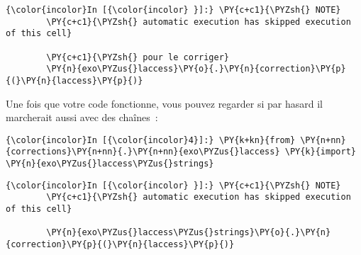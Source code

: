     \begin{Verbatim}[commandchars=\\\{\}]
{\color{incolor}In [{\color{incolor} }]:} \PY{c+c1}{\PYZsh{} NOTE}
        \PY{c+c1}{\PYZsh{} automatic execution has skipped execution of this cell}
        
        \PY{c+c1}{\PYZsh{} pour le corriger}
        \PY{n}{exo\PYZus{}laccess}\PY{o}{.}\PY{n}{correction}\PY{p}{(}\PY{n}{laccess}\PY{p}{)}
\end{Verbatim}


    Une fois que votre code fonctionne, vous pouvez regarder si par hasard
il marcherait aussi avec des chaînes~:

    \begin{Verbatim}[commandchars=\\\{\}]
{\color{incolor}In [{\color{incolor}4}]:} \PY{k+kn}{from} \PY{n+nn}{corrections}\PY{n+nn}{.}\PY{n+nn}{exo\PYZus{}laccess} \PY{k}{import} \PY{n}{exo\PYZus{}laccess\PYZus{}strings}
\end{Verbatim}


    \begin{Verbatim}[commandchars=\\\{\}]
{\color{incolor}In [{\color{incolor} }]:} \PY{c+c1}{\PYZsh{} NOTE}
        \PY{c+c1}{\PYZsh{} automatic execution has skipped execution of this cell}
        
        \PY{n}{exo\PYZus{}laccess\PYZus{}strings}\PY{o}{.}\PY{n}{correction}\PY{p}{(}\PY{n}{laccess}\PY{p}{)}
\end{Verbatim}



    
    
    
